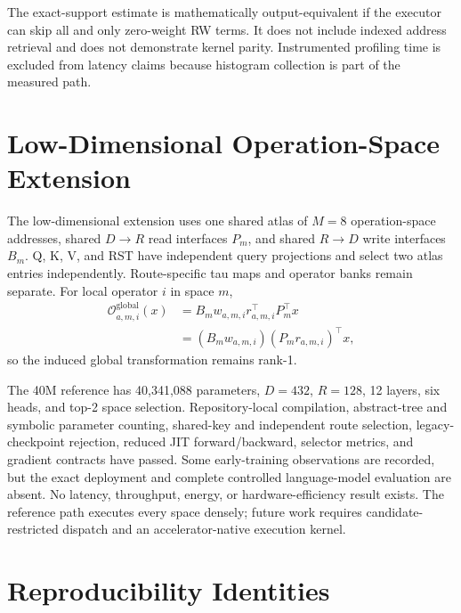 \documentclass{article}
\newcommand{\op}{\mathcal{O}}
\begin{document}
The exact-support estimate is mathematically output-equivalent if the executor
can skip all and only zero-weight RW terms. It does not include indexed
address retrieval and does not demonstrate kernel parity. Instrumented
profiling time is excluded from latency claims because histogram collection is
part of the measured path.

\section{Low-Dimensional Operation-Space Extension}
\label{app:lowd}

The low-dimensional extension uses one shared atlas of \(M=8\) operation-space
addresses, shared \(D\!\to\!R\) read interfaces \(P_m\), and shared
\(R\!\to\!D\) write interfaces \(B_m\). Q, K, V, and RST have independent
query projections and select two atlas entries independently. Route-specific
tau maps and operator banks remain separate. For local operator \(i\) in space
\(m\),
\[
\begin{aligned}
\op^{\mathrm{global}}_{a,m,i}(x)
&=B_m w_{a,m,i}r_{a,m,i}^{\top}P_m^\top x\\
&=(B_mw_{a,m,i})(P_mr_{a,m,i})^\top x,
\end{aligned}
\]
so the induced global transformation remains rank-1.

The 40M reference has 40,341,088 parameters, \(D=432\), \(R=128\), 12
layers, six heads, and top-2 space selection. Repository-local compilation,
abstract-tree and symbolic parameter counting, shared-key and independent
route selection, legacy-checkpoint rejection, reduced JIT
forward/backward, selector metrics, and gradient contracts have passed.
Some early-training observations are recorded, but the exact deployment and
complete controlled language-model evaluation are absent. No latency,
throughput, energy, or hardware-efficiency result exists. The reference path
executes every space densely; future work requires candidate-restricted
dispatch and an accelerator-native execution kernel.

\section{Reproducibility Identities}
\label{app:repro}
\end{document}
